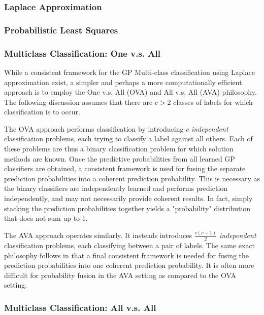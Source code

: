 			\subsubsection{Laplace Approximation}
				
			\subsubsection{Probabilistic Least Squares}
			
			\subsubsection{Multiclass Classification: One v.s. All}
			
				While a consistent framework for the GP Multi-class classification using Laplace approximation exist, a simpler and perhaps a more computationally efficient approach is to employ the One v.s. All (OVA) and All v.s. All (AVA) philosophy. The following discussion assumes that there are $c > 2$ classes of labels for which classification is to occur. 
				
				The OVA approach performs classification by introducing $c$ \textit{independent} classification problems, each trying to classify a label against all others. Each of these problems are thus a binary classification problem for which solution methods are known. Once the predictive probabilities from all learned GP classifiers are obtained, a consistent framework is used for fusing the separate prediction probabilities into a coherent prediction probability. This is necessary as the binary classifiers are independently learned and performs prediction independently, and may not necessarily provide coherent results. In fact, simply stacking the prediction probabilities together yields a "probability" distribution that does not sum up to 1.
				
				The AVA approach operates similarly. It insteads introduces $\frac{c (c - 1)}{2}$ \textit{independent} classification problems, each classifying between a pair of labels. The same exact philosophy follows in that a final consistent framework is needed for fusing the prediction probabilities into one coherent prediction probability. It is often more difficult for probability fusion in the AVA setting as compared to the OVA setting.
			
			\subsubsection{Multiclass Classification: All v.s. All}
				
